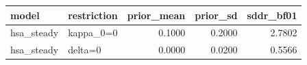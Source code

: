 \begin{tabular}{llrrr}
\toprule
model & restriction & prior\_mean & prior\_sd & sddr\_bf01 \\
\midrule
hsa\_steady & kappa\_0=0 & 0.1000 & 0.2000 & 2.7802 \\
hsa\_steady & delta=0 & 0.0000 & 0.0200 & 0.5566 \\
\bottomrule
\end{tabular}
